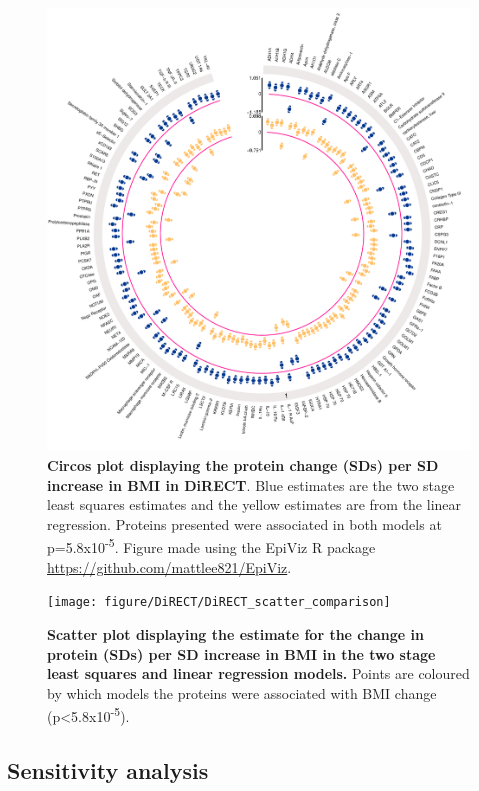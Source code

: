 \documentclass[11pt,twoside]{bristolthesis}
\newcommand{\blandscape}{\begin{landscape}}
\newcommand{\elandscape}{\end{landscape}}
\begin{document}
\begin{figure}
\includegraphics[width=0.8\linewidth]{figure/DiRECT/circos_plot_BMI_change_protein_ols_tsls} \caption[Circos plot of proteins associated with BMI change in DiRECT]{\textbf{Circos plot displaying the protein change (SDs) per SD increase in BMI in DiRECT}. Blue estimates are the two stage least squares estimates and the yellow estimates are from the linear regression. Proteins presented were associated in both models at p=5.8x10\textsuperscript{-5}. Figure made using the EpiViz R package \url{https://github.com/mattlee821/EpiViz}.}\label{fig:circos}
\end{figure}
\blandscape



\begin{figure}
\texttt{[image: figure/DiRECT/DiRECT\_scatter\_comparison]} \caption[Scatter plot comparing proteins association with BMI change across models in DiRECT]{\textbf{Scatter plot displaying the estimate for the change in protein (SDs) per SD increase in BMI in the two stage least squares and linear regression models.} Points are coloured by which models the proteins were associated with BMI change (p\textless5.8x10\textsuperscript{-5}).}\label{fig:scatter-DiRECT}
\end{figure}
\elandscape

\hypertarget{sensitivity-analysis}{%
\subsection{Sensitivity analysis}\label{sensitivity-analysis}}
\end{document}
